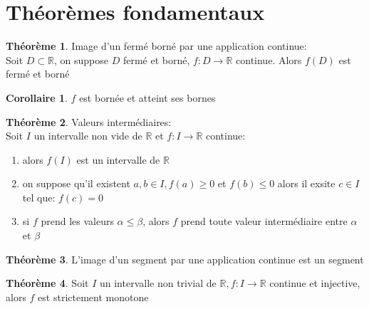 \documentclass[fleqn]{article}
\theoremstyle{definition} \newtheorem*{defi}{D\'efinition}
\theoremstyle{definition} \newtheorem*{theo}{Th\'eor\`eme}
\theoremstyle{definition} \newtheorem*{coro}{Corollaire}
\theoremstyle{remark} \newtheorem*{rqs}{Remarques}
\begin{document}
\section{Th\'eor\`emes fondamentaux}
\begin{theo}
	Image d'un ferm\'e born\'e par une application continue: \\
	Soit $D \subset \mathbb{R}$, on suppose $D$ ferm\'e et born\'e, $f:D \rightarrow \mathbb{R}$ continue. Alors $f(D)$ est ferm\'e et born\'e
	\begin{coro}
		$f$ est born\'ee et atteint ses bornes
	\end{coro}
\end{theo}
\begin{theo}
	Valeurs interm\'ediaires: \\
	Soit $I$ un intervalle non vide de $\mathbb{R}$ et $f:I \rightarrow \mathbb{R}$ continue:
	\begin{enumerate}
		\item alors $f(I)$ est un intervalle de $\mathbb{R}$
		\item on suppose qu'il existent $a,b \in I, f(a) \geq 0$ et $f(b) \leq 0$ alors il exsite $c \in I$ tel que: $f(c) = 0$
		\item si $f$ prend les valeurs $\alpha \leq \beta$, alors $f$ prend toute valeur interm\'ediaire entre $\alpha$ et $\beta$
	\end{enumerate}
\end{theo}
\begin{theo}
	L'image d'un segment par une application continue est un segment
\end{theo}
\begin{theo}
	Soit $I$ un intervalle non trivial de $\mathbb{R}, f:I \rightarrow \mathbb{R}$ continue et injective, alors $f$ est strictement monotone
\end{theo}
\end{document}
